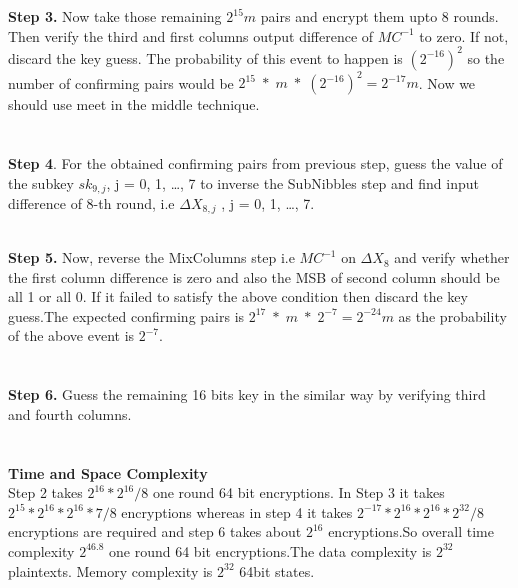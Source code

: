 \begin{frame}
\textbf{Step 3.} Now take those remaining $2^{15}m$ pairs and encrypt them upto 8 rounds. Then verify the third and first columns output difference of $MC^{-1}$  to zero. If not, discard the key guess. The probability of this event to happen is $(2 ^{-16})^{2}$ so the number of confirming pairs would be $2^{15} \;*\; m \;*\; (2 ^{-16})^{2} = 2^{-17}m$. Now we should use meet in the middle technique. \\ \\ \\
\textbf{Step 4}. For the obtained confirming pairs from previous step,  guess the value of the subkey $sk_{9,j}$, j = 0, 1, \ldots, 7 to inverse the SubNibbles step and find input difference of 8-th round, i.e $\Delta X_{8,j}$ , j = 0, 1, \ldots, 7. \\ \\
\end{frame}

\begin{frame}
    \textbf{Step 5.} Now, reverse the MixColumns step i.e $MC^{-1}$ on $\Delta X_{8}$ and verify whether the first column difference is zero and also the MSB of second column should be all 1 or all 0. If it failed to satisfy the above condition then discard the key guess.The expected confirming pairs is $2^{17}\;*\;m\;*\;2^{-7} = 2^{-24}m$ as the probability of the above event is $2^{-7}$.\\ \\ \\
\textbf{Step 6.} Guess the remaining 16 bits key in the similar way by verifying third and fourth columns.\\ \\ \\
\textbf{Time and Space Complexity} \\
Step 2 takes $2^{16}*2^{16}/8$ one round 64 bit encryptions. In Step 3 it takes $2^{15}*2^{16}*2^{16}*7/8$ encryptions whereas in step 4 it takes $2^{-17}*2^{16}*2^{16}*2^{32}/8$ encryptions are required and step 6 takes about $2^{16}$ encryptions.So overall time complexity $2^{46.8}$ one round 64 bit encryptions.The data complexity is $2^{32}$ plaintexts. Memory complexity is $2^{32}$ 64bit states. 
\end{frame}

